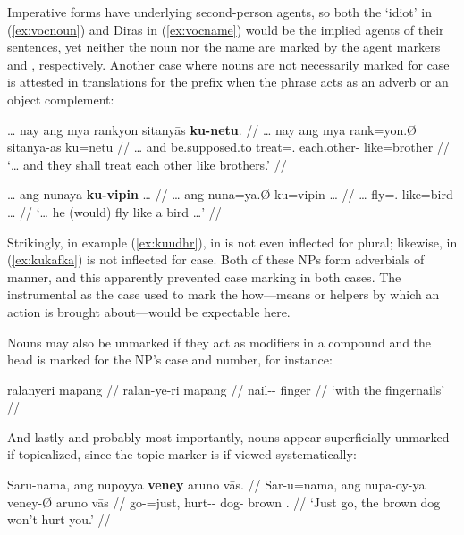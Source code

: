 Imperative forms have underlying second-person agents, so both the `idiot' in
(\ref{ex:vocnoun}) and Diras in (\ref{ex:vocname}) would be the implied agents
of their sentences, yet neither the noun nor the name are marked by the agent
markers  and , respectively. Another case where
nouns are not necessarily marked for case is attested in translations for the
prefix  when the phrase acts as an adverb or an
object complement:

\pex
\a\label{ex:kuudhr}\begingl
	\gla … nay ang mya rankyon sitanyās \textbf{ku-netu}. //
	\glb … nay ang mya rank=yon.Ø sitanya-as ku=netu //
	\glc … and \AgtT{} be.supposed.to treat=\TplN{}.\Top{} 
		each.other-\Parg{} like=brother //
	\glft `… and they shall treat each other like brothers.'\footnotemark%
	//
\endgl

\a\label{ex:kukafka}\begingl
	\gla … ang nunaya \textbf{ku-vipin} … //
	\glb … ang nuna=ya.Ø ku=vipin … //
	\glc … \AgtT{} fly=\TsgM{}.\Top{} like=bird … //
	\glft `… he (would) fly like a bird …'%
	//
\endgl

\xe


Strikingly, in example (\ref{ex:kuudhr}),  in 
 is not even inflected for plural;
likewise,  in (\ref{ex:kukafka}) is not
inflected for case. Both of these NPs form adverbials of manner, and this
apparently prevented case marking in both cases. The instrumental as the case
used to mark the how---means or helpers by which an action is brought about---would be expectable here.

Nouns may also be unmarked if they act as modifiers in a compound and the head 
is marked for the NP's case and number, for instance:

\ex\begingl
	\gla ralanyeri mapang //
	\glb ralan-ye-ri mapang //
	\glc nail-\Pl{}-\Ins{} finger //
	\glft `with the fingernails' //
\endgl\xe

And lastly and probably most importantly, nouns appear superficially unmarked 
if topicalized, since the topic marker is  if viewed systematically:

\ex\begingl
	\gla Saru-nama, ang nupoyya \textbf{veney} aruno vās. //
	\glb Sar-u=nama, ang nupa-oy-ya veney-Ø aruno vās //
	\glc go-\Imp{}=just, \AgtT{} hurt-\Neg{}-\TsgM{} dog-\Top{} brown 
		\Ssg{}.\Parg{} //
	\glft `Just go, the brown dog won't hurt you.' //
\endgl\xe

